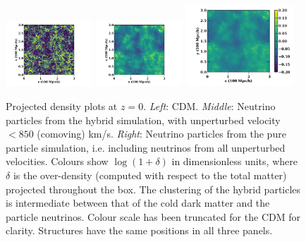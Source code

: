 \documentclass[useAMS, usenatbib]{mnras}
\begin{document}
\begin{figure}
\includegraphics[trim={1.5cm 0 3.3cm 0},clip,width=0.29\textwidth]{nuplots/dens-plt-b300p512nu0_4hyb850t1.pdf}
\includegraphics[trim={1.5cm 0 3.3cm 0},clip, width=0.29\textwidth]{nuplots/dens-plt-b300p512nu0_4hyb850t2.pdf}
\includegraphics[trim={1.5cm 0 0.5cm 0},clip, width=0.36\textwidth]{nuplots/dens-plt-b300p512nu0_4p1024t2.pdf}
    \caption{Projected density plots at $z=0$. \emph{Left}: CDM. \emph{Middle}: Neutrino particles from the hybrid simulation, with unperturbed velocity $<850$ (comoving) km/s. \emph{Right}: Neutrino particles from the pure particle simulation, i.e. including neutrinos from all unperturbed velocities. Colours show $\log (1+ \delta)$ in dimensionless units, where $\delta$ is the over-density (computed with respect to the total matter) projected throughout the box.
  The clustering of the hybrid particles is intermediate between that of the cold dark matter and the particle neutrinos. Colour scale has been truncated for the CDM for clarity. Structures have the same positions in all three panels.
  }
  \label{fig:density_plot}
\end{figure}
\end{document}
